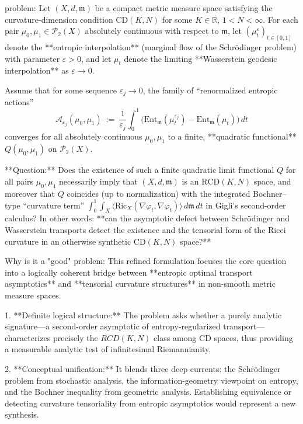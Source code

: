 problem:  
Let \((X,d,\mathfrak{m})\) be a compact metric measure space satisfying the curvature-dimension condition \(\mathrm{CD}(K,N)\) for some \(K \in \mathbb{R}\), \(1 < N < \infty\).  
For each pair \(\mu_0, \mu_1 \in \mathcal{P}_2(X)\) absolutely continuous with respect to \(\mathfrak{m}\), let \((\mu_t^\varepsilon)_{t \in [0,1]}\) denote the **entropic interpolation** (marginal flow of the Schrödinger problem) with parameter \(\varepsilon > 0\), and let \(\mu_t\) denote the limiting **Wasserstein geodesic interpolation** as \(\varepsilon \to 0\).

Assume that for some sequence \(\varepsilon_j \to 0\), the family of “renormalized entropic actions”
\[
\mathcal{A}_{\varepsilon_j}(\mu_0,\mu_1) \ :=\ \frac{1}{\varepsilon_j}\int_0^1\Big(\mathrm{Ent}_{\mathfrak{m}}(\mu_t^{\varepsilon_j}) - \mathrm{Ent}_{\mathfrak{m}}(\mu_t)\Big)\,dt
\]
converges for all absolutely continuous \(\mu_0,\mu_1\) to a finite, **quadratic functional** \(Q(\mu_0,\mu_1)\) on \(\mathcal{P}_2(X)\).

**Question:**  
Does the existence of such a finite quadratic limit functional \(Q\) for all pairs \(\mu_0,\mu_1\) necessarily imply that \((X,d,\mathfrak{m})\) is an \(\mathrm{RCD}(K,N)\) space, and moreover that \(Q\) coincides (up to normalization) with the integrated Bochner–type “curvature term” \(\int_0^1\!\!\int_X \langle \mathrm{Ric}_X(\nabla \varphi_t,\nabla \varphi_t)\rangle\,d\mathfrak{m}\,dt\) in Gigli’s second-order calculus?  
In other words: **can the asymptotic defect between Schrödinger and Wasserstein transports detect the existence and the tensorial form of the Ricci curvature in an otherwise synthetic \(\mathrm{CD}(K,N)\) space?**

Why is it a "good" problem:  
This refined formulation focuses the core question into a logically coherent bridge between **entropic optimal transport asymptotics** and **tensorial curvature structures** in non-smooth metric measure spaces.  
   
1. **Definite logical structure:**  
   The problem asks whether a purely analytic signature—a second-order asymptotic of entropy-regularized transport—characterizes precisely the \(RCD(K,N)\) class among CD spaces, thus providing a measurable analytic test of infinitesimal Riemannianity.  
   
2. **Conceptual unification:**  
   It blends three deep currents: the Schrödinger problem from stochastic analysis, the information-geometry viewpoint on entropy, and the Bochner inequality from geometric analysis. Establishing equivalence or detecting curvature tensoriality from entropic asymptotics would represent a new synthesis.  
   
